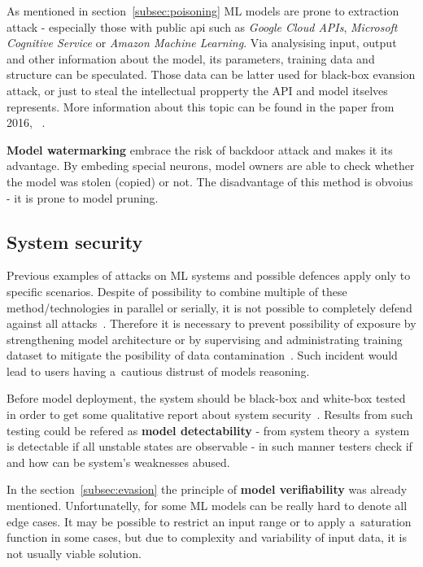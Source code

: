 As mentioned in section~\ref{subsec:poisoning} ML models are prone to extraction attack - especially those with public \acrshort{api} such as \textit{Google Cloud APIs}, \textit{Microsoft Cognitive Service} or \textit{Amazon Machine Learning}.
Via analysising input, output and other information about the model, its parameters, training data and structure can be speculated.
Those data can be latter used for black-box evansion attack, or just to steal the intellectual propperty the API and model itselves represents.
More information about this topic can be found in the paper from 2016, ~\cite{usenix:stealing_models}.

\textbf{Model watermarking} embrace the risk of backdoor attack and makes it its advantage.
By embeding special neurons, model owners are able to check whether the model was stolen (copied) or not.
The disadvantage of this method is obvoius - it is prone to model pruning.

\subsection{System security}\label{subsec:system-security}

Previous examples of attacks on ML systems and possible defences apply only to specific scenarios.
Despite of possibility to combine multiple of these method/technologies in parallel or serially, it is not possible to completely defend against all attacks~\cite{huawei_security}.
Therefore it is necessary to prevent possibility of exposure by strengthening model architecture or by supervising and administrating training dataset to mitigate the posibility of data contamination~\cite{chio2018machine}.
Such incident would lead to users having a~cautious distrust of models reasoning.

Before model deployment, the system should be black-box and white-box tested in order to get some qualitative report about system security~\cite{huawei_security}.
Results from such testing could be refered as \textbf{model detectability} - from system theory a~system is detectable if all unstable states are observable - in such manner testers check if and how can be system's weaknesses abused.

In the section~\ref{subsec:evasion} the principle of \textbf{model verifiability} was already mentioned.
Unfortunatelly, for some ML models can be really hard to denote all edge cases.
It may be possible to restrict an input range or to apply a~saturation function in some cases, but due to complexity and variability of input data, it is not usually viable solution.

